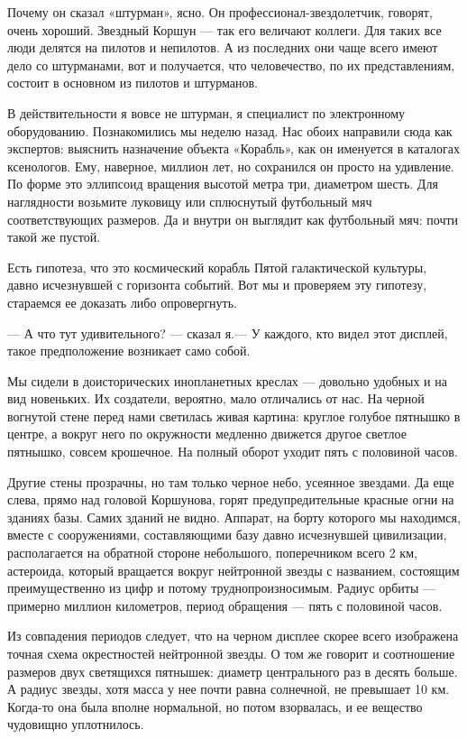 \documentclass[11pt,a4paper,oneside]{article}
\begin{document}
Почему он сказал «штурман», ясно. Он профессионал-звездолетчик, говорят, очень хороший. Звездный Коршун — так его величают коллеги. Для таких все люди делятся на пилотов и непилотов. А из последних они чаще всего имеют дело со штурманами, вот и получается, что человечество, по их представлениям, состоит в основном из пилотов и штурманов.

В действительности я вовсе не штурман, я специалист по электронному оборудованию. Познакомились мы неделю назад. Нас обоих направили сюда как экспертов: выяснить назначение объекта «Корабль», как он именуется в каталогах ксенологов. Ему, наверное, миллион лет, но сохранился он просто на удивление. По форме это эллипсоид вращения высотой метра три, диаметром шесть. Для наглядности возьмите луковицу или сплюснутый футбольный мяч соответствующих размеров. Да и внутри он выглядит как футбольный мяч: почти такой же пустой.

Есть гипотеза, что это космический корабль Пятой галактической культуры, давно исчезнувшей с горизонта событий. Вот мы и проверяем эту гипотезу, стараемся ее доказать либо опровергнуть.

— А что тут удивительного? — сказал я.— У каждого, кто видел этот дисплей, такое предположение возникает само собой.

Мы сидели в доисторических инопланетных креслах — довольно удобных и на вид новеньких. Их создатели, вероятно, мало отличались от нас. На черной вогнутой стене перед нами светилась живая картина: круглое голубое пятнышко в центре, а вокруг него по окружности медленно движется другое светлое пятнышко, совсем крошечное. На полный оборот уходит пять с половиной часов.

Другие стены прозрачны, но там только черное небо, усеянное звездами. Да еще слева, прямо над головой Коршунова, горят предупредительные красные огни на зданиях базы. Самих зданий не видно. Аппарат, на борту которого мы находимся, вместе с сооружениями, составляющими базу давно исчезнувшей цивилизации, располагается на обратной стороне небольшого, поперечником всего 2 км, астероида, который вращается вокруг нейтронной звезды с названием, состоящим преимущественно из цифр и потому труднопроизносимым. Радиус орбиты — примерно миллион километров, период обращения — пять с половиной часов.

Из совпадения периодов следует, что на черном дисплее скорее всего изображена точная схема окрестностей нейтронной звезды. О том же говорит и соотношение размеров двух светящихся пятнышек: диаметр центрального раз в десять больше. А радиус звезды, хотя масса у нее почти равна солнечной, не превышает 10 км. Когда-то она была вполне нормальной, но потом взорвалась, и ее вещество чудовищно уплотнилось.
\end{document}
